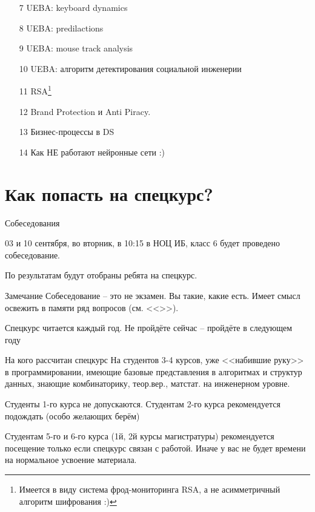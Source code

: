 \documentclass{beamer}
\newcommand{\рис}[1]{рис.\ref{#1}}
\newcommand{\Рис}[1]{Рис.\ref{#1}}
\newcommand{\таблицa}[1]{таблица~№\ref{#1}} %
\newcommand{\таблицы}[1]{таблицы~№\ref{#1}} %
\newcommand{\таблице}[1]{таблице~№\ref{#1}} %
\newcommand{\таблицу}[1]{таблицу~№\ref{#1}} %
\newcommand{\таблицей}[1]{таблицей~№\ref{#1}} %
\newcommand{\Таблицa}[1]{Таблица~№\ref{#1}} %
\newcommand{\Таблицы}[1]{Таблицы~№\ref{#1}} %
\newcommand{\Таблице}[1]{Таблице~№\ref{#1}} %
\newcommand{\Таблицу}[1]{Таблицу~№\ref{#1}} %
\newcommand{\Таблицей}[1]{Таблицей~№\ref{#1}} %
\begin{document}
  \begin{frame}
\begin{enumerate}
	\item[7] UEBA: keyboard dynamics
	\item[8] UEBA: predilactions
	\item[9] UEBA: mouse track analysis
	\item[10] UEBA: алгоритм детектирования социальной инженерии
	\item[11] RSA\footnote{Имеется в виду система фрод-мониторинга RSA, а не асимметричный алгоритм шифрования :)} 
	\item[12] Brand Protection и Anti Piracy.
	\item[13] Бизнес-процессы в DS
	\item[14] Как НЕ работают нейронные сети :)
\end{enumerate}
\end{frame}

  \section{Как попасть на спецкурс?}\label{section:how_to}
  
  \begin{frame}{Собеседования}
  
  03 и 10 сентября, во вторник, в 10:15 в НОЦ ИБ, класс 6
  будет проведено собеседование. 
	
  По результатам будут отобраны ребята на спецкурс.

   \begin{block}{Замечание}
   	Собеседование -- это не экзамен. Вы такие, какие есть. 
   	Имеет смысл освежить в памяти ряд вопросов 
   	(см. <<>>).
   	
   	Спецкурс читается каждый год. Не пройдёте сейчас -- 
   	пройдёте в следующем году
   \end{block}
  
  \end{frame}
  
  \begin{frame}{На кого рассчитан спецкурс}
  На студентов 3-4 курсов, уже <<набившие руку>> в программировании,
  имеющие базовые представления в алгоритмах и структур данных,
  знающие комбинаторику, теор.вер., матстат. на инженерном уровне.
  
  Студенты 1-го курса не допускаются. Студентам 2-го курса рекомендуется подождать
  (особо желающих берём)
  
  Студентам 5-го и 6-го курса (1й, 2й курсы магистратуры) рекомендуется посещение только если 
  спецкурс
  связан с работой.
  Иначе у вас не будет времени на нормальное усвоение материала.
  
  \end{frame}
\end{document}
